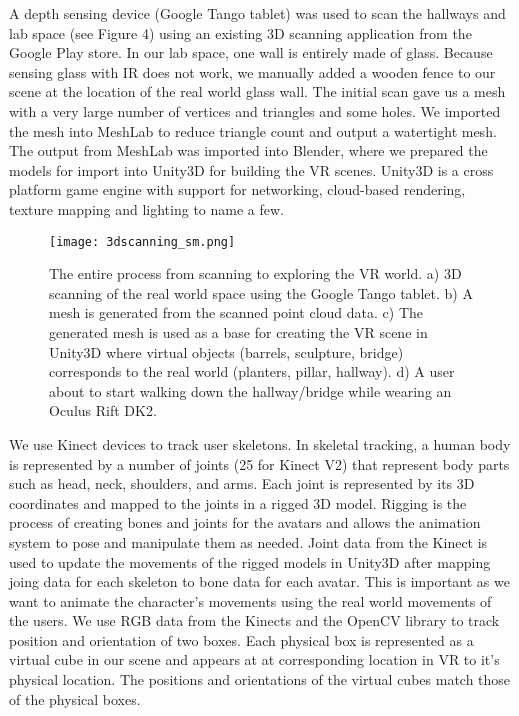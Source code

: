 \documentclass{sigchi}
\begin{document}
A depth sensing device (Google Tango tablet) was used to scan the hallways and lab space (see Figure 4) using an existing 3D scanning application from the Google Play store. In our lab space, one wall is entirely made of glass. Because sensing glass with IR does not work, we manually added a wooden fence to our scene at the location of the real world glass wall.  The initial scan gave us a mesh with a very large number of vertices and triangles and some holes. We imported the mesh into MeshLab to reduce triangle count and output a watertight mesh. The output from MeshLab was imported into Blender, where we prepared the models for import into Unity3D for building the VR scenes. Unity3D is a cross platform game engine with support for networking, cloud-based rendering, texture mapping and lighting to name a few. 


\begin{figure}[!t]
\centering
\texttt{[image: 3dscanning\_sm.png]}
\caption{The entire process from scanning to exploring the VR world. a) 3D scanning of the real world space using the Google Tango tablet. b) A mesh is generated from the scanned point cloud data. c) The generated mesh is used as a base for creating the VR scene in Unity3D where virtual objects (barrels, sculpture, bridge) corresponds to the real world (planters, pillar, hallway). d) A user about to start walking down the hallway/bridge while wearing an Oculus Rift DK2.}
\label{fig:setup}
\end{figure}


We use Kinect devices to track user skeletons. In skeletal tracking, a human body is represented by a number of joints (25 for Kinect V2) that represent body parts such as head, neck, shoulders, and arms. Each joint is represented by its 3D coordinates and mapped to the joints in a rigged 3D model. Rigging is the process of creating bones and joints for the avatars and allows the animation system to pose and manipulate them as needed. Joint data from the Kinect is used to update the movements of the rigged models in Unity3D after mapping joing data for each skeleton to bone data for each avatar. This is important as we want to animate the character's movements using the real world movements of the users. We use RGB data from the Kinects and the OpenCV library to track position and orientation of two boxes. Each physical box is represented as a virtual cube in our scene and appears at at corresponding location in VR to it's physical location. The positions and orientations of the virtual cubes match those of the physical boxes. 
\end{document}
